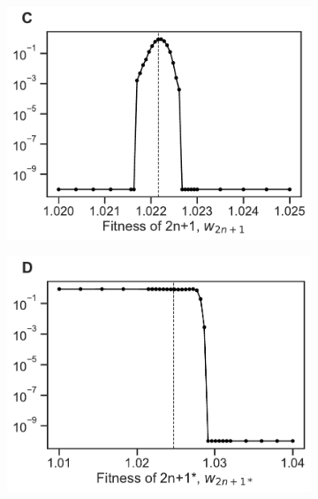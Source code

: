\documentclass[12pt]{extarticle}
\begin{document}
\begin{figure}[p]
\begin{subfigure}{0.3\textwidth}
      \includegraphics[width=\textwidth]{../figures/sensitivity-C.pdf}      
      \label{fig:sensitivity-anwt}
  \end{subfigure}
    \begin{subfigure}{0.3\textwidth}
      \includegraphics[width=\textwidth]{../figures/sensitivity-D.pdf}      
      \label{fig:sensitivity-anmt}
  \end{subfigure}
    \begin{subfigure}{0.3\textwidth}

\end{subfigure}
\end{figure}
\end{document}
